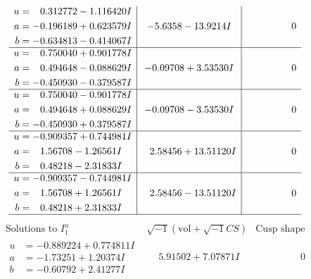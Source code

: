 \documentclass[1p]{elsarticle_modified}
\theoremstyle{definition}
\newcommand{\I}{\sqrt{-1}}
\begin{document}
$$\begin{array}{c|c|c}
\begin{aligned}
u &= \phantom{-}0.312772 - 1.116420 I \\
a &= -0.196189 + 0.623579 I \\
b &= -0.634813 - 0.414067 I\end{aligned}
 & -5.6358 - 13.9214 I & \phantom{-0.000000 } 0 \\ \hline\begin{aligned}
u &= \phantom{-}0.750040 + 0.901778 I \\
a &= \phantom{-}0.494648 - 0.088629 I \\
b &= -0.450930 - 0.379587 I\end{aligned}
 & -0.09708 + 3.53530 I & \phantom{-0.000000 } 0 \\ \hline\begin{aligned}
u &= \phantom{-}0.750040 - 0.901778 I \\
a &= \phantom{-}0.494648 + 0.088629 I \\
b &= -0.450930 + 0.379587 I\end{aligned}
 & -0.09708 - 3.53530 I & \phantom{-0.000000 } 0 \\ \hline\begin{aligned}
u &= -0.909357 + 0.744981 I \\
a &= \phantom{-}1.56708 - 1.26561 I \\
b &= \phantom{-}0.48218 - 2.31833 I\end{aligned}
 & \phantom{-}2.58456 + 13.51120 I & \phantom{-0.000000 } 0 \\ \hline\begin{aligned}
u &= -0.909357 - 0.744981 I \\
a &= \phantom{-}1.56708 + 1.26561 I \\
b &= \phantom{-}0.48218 + 2.31833 I\end{aligned}
 & \phantom{-}2.58456 - 13.51120 I & \phantom{-0.000000 } 0\\
 \hline 
 \end{array}$$\newpage$$\begin{array}{c|c|c}  
\text{Solutions to }I^u_{1}& \I (\text{vol} + \sqrt{-1}CS) & \text{Cusp shape}\\
 \hline 
\begin{aligned}
u &= -0.889224 + 0.774811 I \\
a &= -1.73251 + 1.20374 I \\
b &= -0.60792 + 2.41277 I\end{aligned}
 & \phantom{-}5.91502 + 7.07871 I & \phantom{-0.000000 } 0 \\ \hline\begin{aligned}

\end{aligned}
\end{array}$$
\end{document}
